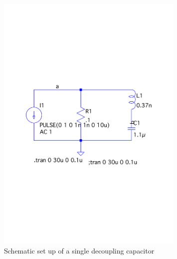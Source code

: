 \documentclass[12pt,a4paper,UKenglish]{article}
\begin{document}
\begin{figure} [H]
  \centering 
  \includegraphics[width=0.8\textwidth]{img/sch_3.pdf} 
  \caption{Schematic set up of a single decoupling capacitor}
  \label{sch_3} 
\end{figure}
\end{document}
